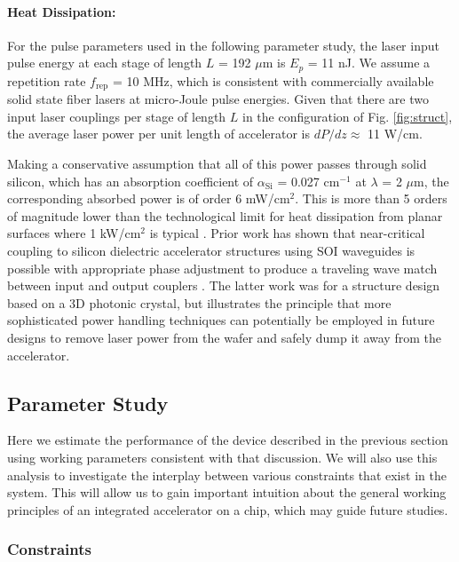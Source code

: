 \paragraph{Heat Dissipation:}

For the pulse parameters used in the following parameter study, the laser input pulse energy at each stage of length $L$ = 192 $\mu$m is $E_p$ = 11 nJ.
We assume a repetition rate $f_\text{rep}$ = 10 MHz, which is consistent with commercially available solid state fiber lasers at micro-Joule pulse energies.
Given that there are two input laser couplings per stage of length $L$ in the configuration of Fig.
\ref{fig:struct}, the average laser power per unit length of accelerator is $dP/dz \approx$ 11 W/cm.

Making a conservative assumption that all of this power passes through solid silicon, which has an absorption coefficient of $\alpha_\text{Si}$ = 0.027 $\text{cm}^{-1}$ at $\lambda$ = 2 $\mu$m, the corresponding absorbed power is of order 6 mW/$\text{cm}^2$.
This is more than 5 orders of magnitude lower than the technological limit for heat dissipation from planar surfaces where 1 kW/$\text{cm}^2$ is typical \cite{eggleston:1984,rutherford:2000}.
Prior work has shown that near-critical coupling to silicon dielectric accelerator structures using SOI waveguides is possible with appropriate phase adjustment to produce a traveling wave match between input and output couplers \cite{wu:2014}.
The latter work was for a structure design based on a 3D photonic crystal, but illustrates the principle that more sophisticated power handling techniques can potentially be employed in future designs to remove laser power from the wafer and safely dump it away from the accelerator.

\subsection{Parameter Study}

Here we estimate the performance of the device described in the previous section using working parameters consistent with that discussion.  We will also use this analysis to investigate the interplay between various constraints that exist in the system.  This will allow us to gain important intuition about the general working principles of an integrated accelerator on a chip, which may guide future studies.

\subsubsection{\label{sec:constraints}Constraints}

